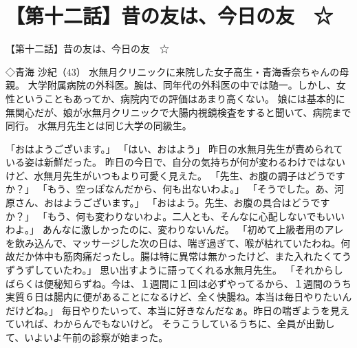 \section{【第十二話】昔の友は、今日の友　☆}
【第十二話】昔の友は、今日の友　☆



◇青海 沙紀（43）
水無月クリニックに来院した女子高生・青海香奈ちゃんの母親。
大学附属病院の外科医。腕は、同年代の外科医の中では随一。しかし、女性ということもあってか、病院内での評価はあまり高くない。
娘には基本的に無関心だが、娘が水無月クリニックで大腸内視鏡検査をすると聞いて、病院まで同行。
水無月先生とは同じ大学の同級生。

「おはようございます。」
「はい、おはよう」
昨日の水無月先生が責められている姿は新鮮だった。
昨日の今日で、自分の気持ちが何が変わるわけではないけど、水無月先生がいつもより可愛く見えた。
「先生、お腹の調子はどうですか？」
「もう、空っぽなんだから、何も出ないわよ。」
「そうでした。あ、河原さん、おはようございます。」
「おはよう。先生、お腹の具合はどうですか？」
「もう、何も変わりないわよ。二人とも、そんなに心配しないでもいいわよ。」
あんなに激しかったのに、変わりないんだ。
「初めて上級者用のアレを飲み込んで、マッサージした次の日は、喘ぎ過ぎて、喉が枯れていたわね。何故だか体中も筋肉痛だったし。腸は特に異常は無かったけど、また入れたくてうずうずしていたわ。」
思い出すように語ってくれる水無月先生。
「それからしばらくは便秘知らずね。今は、１週間に１回は必ずやってるから、１週間のうち実質６日は腸内に便があることになるけど、全く快腸ね。本当は毎日やりたいんだけどね。」
毎日やりたいって、本当に好きなんだなぁ。昨日の喘ぎようを見えていれば、わからんでもないけど。
そうこうしているうちに、全員が出勤して、いよいよ午前の診察が始まった。

